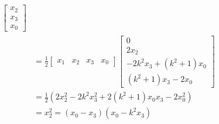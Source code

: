 \documentclass[12 pt, letterpaper]{hmcpset}
\begin{document}
\begin{solution}
\begin{enumerate}
\[\begin{split}
\begin{bmatrix}
						x_{2} \\
						x_{3} \\
						x_{0}
					\end{bmatrix} \\
						  & = \frac{1}{2} \begin{bmatrix}
							  x_{1} & x_{2} & x_{3} & x_{0}
						  \end{bmatrix}
						  \begin{bmatrix}
						  	0 \\
							2 x_{2} \\
							-2k^{2} x_{3} + (k^{2} + 1) x_{0} \\
							(k^{2} + 1) x_{3} - 2 x_{0}
						  \end{bmatrix} \\
						  & = \frac{1}{2} (2 x_{2}^{2} - 2 k^{2} x_{3}^{2} + 2 (k^{2} + 1) x_{0} x_{3} -2 x_{0}^{2}) \\
						  & = x_{2}^{2} = (x_{0} - x_{3})(x_{0} - k^{2} x_{3})
				\end{split}
			\]
	\end{enumerate}
\end{solution}
\end{document}
